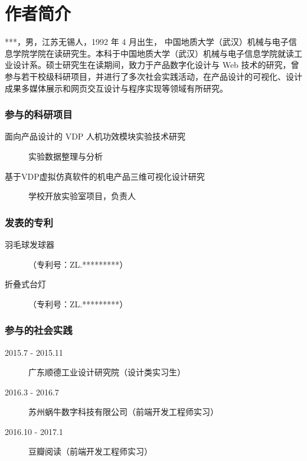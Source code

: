 \chapter*{作者简介}
\begin{spacing}{1.3}

***，男，江苏无锡人，1992 年 4 月出生，
中国地质大学（武汉）机械与电子信息学院学院在读研究生。本科于中国地质大学（武汉）机械与电子信息学院就读工业设计系。硕士研究生在读期间，致力于产品数字化设计与 Web 技术的研究，曾参与若干校级科研项目，并进行了多次社会实践活动，在产品设计的可视化、设计成果多媒体展示和网页交互设计与程序实现等领域有所研究。

% 
\end{spacing}

\subsection*{参与的科研项目}
\begin{description}
	\item[面向产品设计的 VDP 人机功效模块实验技术研究] 实验数据整理与分析
	\item[基于VDP虚拟仿真软件的机电产品三维可视化设计研究] 学校开放实验室项目，负责人
\end{description}

\vskip 12pt

\subsection*{发表的专利}
\begin{description}
	\item[羽毛球发球器]（专利号：ZL.*********）
	\item[折叠式台灯]（专利号：ZL.*********）
\end{description}

\vskip 12pt

\subsection*{参与的社会实践}
\begin{description}
	\item[2015.7 - 2015.11] 广东顺德工业设计研究院（设计类实习生）
	\item[2016.3 - 2016.7] 苏州蜗牛数字科技有限公司（前端开发工程师实习）
	\item[2016.10 - 2017.1] 豆瓣阅读（前端开发工程师实习）
\end{description}